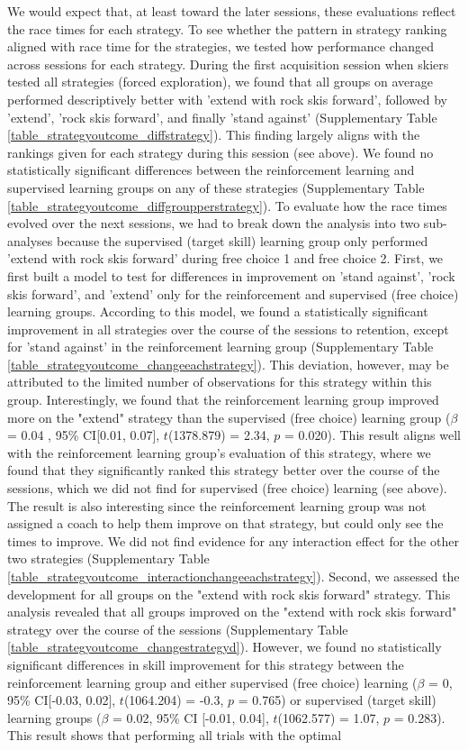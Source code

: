 \documentclass[pdflatex,sn-mathphys-num]{sn-jnl}%
\theoremstyle{thmstyleone}%
\theoremstyle{thmstyletwo}%
\theoremstyle{thmstylethree}%
\begin{document}
We would expect that, at least toward the later sessions, these evaluations reflect the race times for each strategy. To see whether the pattern in strategy ranking aligned with race time for the strategies, we tested how performance changed across sessions for each strategy. During the first acquisition session when skiers tested all strategies (forced exploration), we found that all groups on average performed descriptively better with 'extend with rock skis forward', followed by 'extend', 'rock skis forward', and finally 'stand against' (Supplementary Table \ref{table_strategyoutcome_diffstrategy}). This finding largely aligns with the rankings given for each strategy during this session (see above). We found no statistically significant differences between the reinforcement learning and supervised learning groups on any of these strategies (Supplementary Table \ref{table_strategyoutcome_diffgroupperstrategy}). To evaluate how the race times evolved over the next sessions, we had to break down the analysis into two sub-analyses because the supervised (target skill) learning group only performed 'extend with rock skis forward' during free choice 1 and free choice 2. First, we first built a model to test for differences in improvement on 'stand against', 'rock skis forward', and 'extend' only for the reinforcement  and supervised (free choice) learning groups. According to this model, we found a statistically significant improvement in all strategies over the course of the sessions to retention, except for 'stand against' in the reinforcement learning group (Supplementary Table \ref{table_strategyoutcome_changeeachstrategy}). This deviation, however, may be attributed to the limited number of observations for this strategy within this group. Interestingly, we found that the reinforcement learning group improved more on the "extend" strategy than the supervised (free choice) learning group ($\beta$ = 0.04 , 95\% CI[0.01, 0.07], $t$(1378.879) = 2.34, $p$ = 0.020). This result aligns well with the reinforcement learning group's evaluation of this strategy, where we found that they significantly ranked this strategy better over the course of the sessions, which we did not find for supervised (free choice) learning (see above). The result is also interesting since the reinforcement learning group was not assigned a coach to help them improve on that strategy, but could only see the times to improve. We did not find evidence for any interaction effect for the other two strategies (Supplementary Table \ref{table_strategyoutcome_interactionchangeeachstrategy}). Second, we assessed the development for all groups on the "extend with rock skis forward" strategy. This analysis revealed that all groups improved on the "extend with rock skis forward" strategy  over the course of the sessions (Supplementary Table \ref{table_strategyoutcome_changestrategyd}). However, we found no statistically significant differences in skill improvement for this strategy between the reinforcement learning group and either supervised (free choice) learning ($\beta$ = 0, 95\% CI[-0.03, 0.02], $t$(1064.204) = -0.3, $p$ = 0.765) or supervised (target skill) learning groups ($\beta$ = 0.02, 95\% CI [-0.01, 0.04], $t$(1062.577) = 1.07, $p$ = 0.283). This result shows that performing all trials with the optimal 
\end{document}
